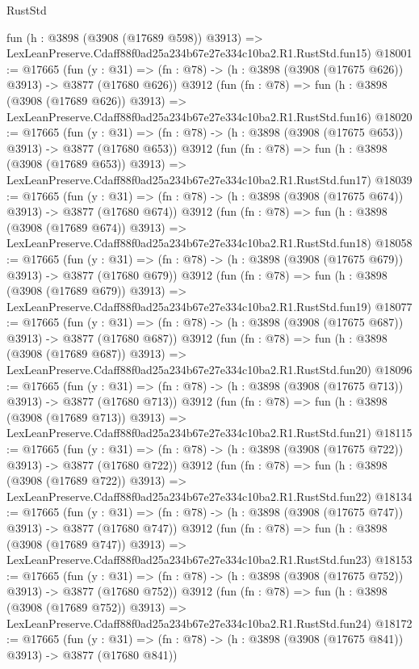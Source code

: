 \begin{lexlean}{RustStd}
\begin{coremodule}
    fun (h : @3898 (@3908 (@17689 @598)) @3913) =>
    LexLeanPreserve.Cdaff88f0ad25a234b67e27e334c10ba2.R1.RustStd.fun15)
@18001 := @17665
    (fun (y : @31) => (fn : @78) -> (h : @3898 (@3908 (@17675 @626)) @3913) -> @3877 (@17680 @626))
    @3912
    (fun (fn : @78) =>
    fun (h : @3898 (@3908 (@17689 @626)) @3913) =>
    LexLeanPreserve.Cdaff88f0ad25a234b67e27e334c10ba2.R1.RustStd.fun16)
@18020 := @17665
    (fun (y : @31) => (fn : @78) -> (h : @3898 (@3908 (@17675 @653)) @3913) -> @3877 (@17680 @653))
    @3912
    (fun (fn : @78) =>
    fun (h : @3898 (@3908 (@17689 @653)) @3913) =>
    LexLeanPreserve.Cdaff88f0ad25a234b67e27e334c10ba2.R1.RustStd.fun17)
@18039 := @17665
    (fun (y : @31) => (fn : @78) -> (h : @3898 (@3908 (@17675 @674)) @3913) -> @3877 (@17680 @674))
    @3912
    (fun (fn : @78) =>
    fun (h : @3898 (@3908 (@17689 @674)) @3913) =>
    LexLeanPreserve.Cdaff88f0ad25a234b67e27e334c10ba2.R1.RustStd.fun18)
@18058 := @17665
    (fun (y : @31) => (fn : @78) -> (h : @3898 (@3908 (@17675 @679)) @3913) -> @3877 (@17680 @679))
    @3912
    (fun (fn : @78) =>
    fun (h : @3898 (@3908 (@17689 @679)) @3913) =>
    LexLeanPreserve.Cdaff88f0ad25a234b67e27e334c10ba2.R1.RustStd.fun19)
@18077 := @17665
    (fun (y : @31) => (fn : @78) -> (h : @3898 (@3908 (@17675 @687)) @3913) -> @3877 (@17680 @687))
    @3912
    (fun (fn : @78) =>
    fun (h : @3898 (@3908 (@17689 @687)) @3913) =>
    LexLeanPreserve.Cdaff88f0ad25a234b67e27e334c10ba2.R1.RustStd.fun20)
@18096 := @17665
    (fun (y : @31) => (fn : @78) -> (h : @3898 (@3908 (@17675 @713)) @3913) -> @3877 (@17680 @713))
    @3912
    (fun (fn : @78) =>
    fun (h : @3898 (@3908 (@17689 @713)) @3913) =>
    LexLeanPreserve.Cdaff88f0ad25a234b67e27e334c10ba2.R1.RustStd.fun21)
@18115 := @17665
    (fun (y : @31) => (fn : @78) -> (h : @3898 (@3908 (@17675 @722)) @3913) -> @3877 (@17680 @722))
    @3912
    (fun (fn : @78) =>
    fun (h : @3898 (@3908 (@17689 @722)) @3913) =>
    LexLeanPreserve.Cdaff88f0ad25a234b67e27e334c10ba2.R1.RustStd.fun22)
@18134 := @17665
    (fun (y : @31) => (fn : @78) -> (h : @3898 (@3908 (@17675 @747)) @3913) -> @3877 (@17680 @747))
    @3912
    (fun (fn : @78) =>
    fun (h : @3898 (@3908 (@17689 @747)) @3913) =>
    LexLeanPreserve.Cdaff88f0ad25a234b67e27e334c10ba2.R1.RustStd.fun23)
@18153 := @17665
    (fun (y : @31) => (fn : @78) -> (h : @3898 (@3908 (@17675 @752)) @3913) -> @3877 (@17680 @752))
    @3912
    (fun (fn : @78) =>
    fun (h : @3898 (@3908 (@17689 @752)) @3913) =>
    LexLeanPreserve.Cdaff88f0ad25a234b67e27e334c10ba2.R1.RustStd.fun24)
@18172 := @17665
    (fun (y : @31) => (fn : @78) -> (h : @3898 (@3908 (@17675 @841)) @3913) -> @3877 (@17680 @841))

\end{coremodule}
\end{lexlean}
